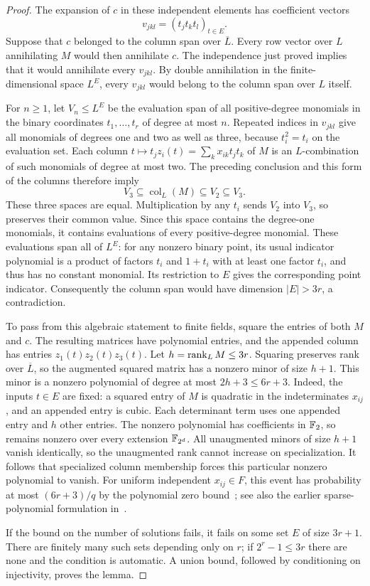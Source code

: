 \begin{proof}
The expansion of $c$ in these independent elements has coefficient vectors
\[
 v_{jkl}=(t_jt_kt_l)_{t\in E}.
\]
Suppose that $c$ belonged to the column span over $\overline L$.
Every row vector over $L$ annihilating $M$ would then annihilate $c$.
The independence just proved implies that it would annihilate every
$v_{jkl}$.  By double annihilation in the finite-dimensional space
$L^E$, every $v_{jkl}$ would belong to the column span over $L$ itself.

For $n\ge1$, let $V_n\le L^E$ be the evaluation span of all
positive-degree monomials in the binary coordinates $t_1,\ldots,t_r$
of degree at most $n$.  Repeated indices in $v_{jkl}$ give all monomials
of degrees one and two as well as three, because $t_i^2=t_i$ on the
evaluation set.  Each column $t\mapsto t_jz_i(t)=\sum_kx_{ik}t_jt_k$ of
$M$ is an $L$-combination of such monomials of degree at most two.  The
preceding conclusion and this form of the columns therefore imply
\[
 V_3\subseteq\operatorname{col}_L(M)\subseteq V_2\subseteq V_3.
\]
These three spaces are equal.  Multiplication by any $t_i$ sends $V_2$
into $V_3$, so preserves their common value.  Since this space contains
the degree-one monomials, it contains evaluations of every positive-degree
monomial.  These evaluations span all of $L^E$: for any nonzero binary
point, its usual indicator polynomial is a product of factors $t_i$ and
$1+t_i$ with at least one factor $t_i$, and thus has no constant monomial.
Its restriction to $E$ gives the corresponding point indicator.
Consequently the column span would have dimension $|E|>3r$, a
contradiction.

To pass from this algebraic statement to finite fields, square the entries
of both $M$ and $c$.  The resulting matrices have polynomial entries,
and the appended column has entries $z_1(t)z_2(t)z_3(t)$.
Let $h=\operatorname{rank}_L M\le3r$.  Squaring preserves rank over $\overline L$,
so the augmented squared matrix has a nonzero minor of size $h+1$.
This minor is a nonzero polynomial of degree at most $2h+3\le6r+3$.
Indeed, the inputs $t\in E$ are fixed: a squared entry of $M$ is
quadratic in the indeterminates $x_{ij}$, and an appended entry is
cubic.  Each determinant term uses one appended entry and $h$ other
entries.  The nonzero polynomial has coefficients in $\mathbb F_2$, so remains
nonzero over every extension $\mathbb F_{2^d}$.
All unaugmented minors of size $h+1$ vanish identically, so the
unaugmented rank cannot increase on specialization.  It follows that
specialized column membership forces this particular nonzero polynomial
to vanish.  For uniform independent $x_{ij}\in F$, this event has
probability at most $(6r+3)/q$ by the polynomial zero bound~\cite[Corollary~1]{Schwartz80};
see also the earlier sparse-polynomial formulation in~\cite[Section~3.1]{Zippel79}.

If the bound on the number of solutions fails, it fails on some set $E$ of size
$3r+1$.  There are finitely many such sets depending only on $r$; if
$2^r-1\le3r$ there are none and the condition is automatic.  A union
bound, followed by conditioning on injectivity, proves the lemma.
\end{proof}

